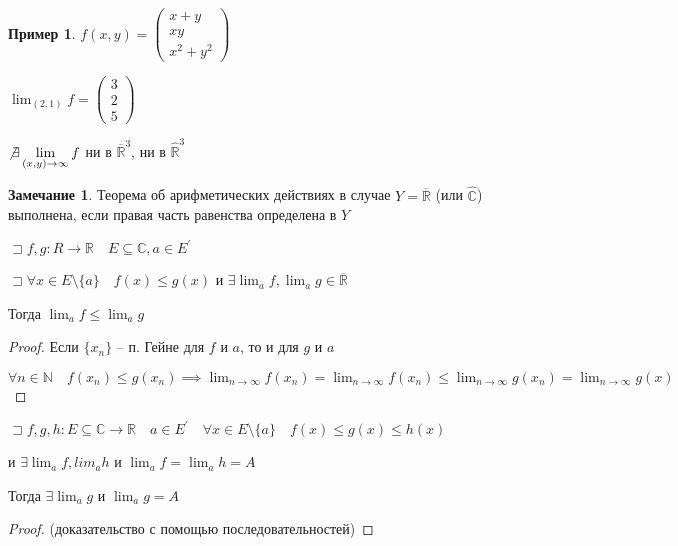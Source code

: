 \documentclass{book}
\newcommand\N{\ensuremath{\mathbb{N}}}
\newcommand\R{\ensuremath{\mathbb{R}}}
\renewcommand\C{\ensuremath{\mathbb{C}}}
\newcommand{\p}[1]{#1^{\prime}}
\newcommand{\ov}[1]{\overline{#1}}
\theoremstyle{definition}
\newtheorem*{note}{Замечание}
\newtheorem*{example}{Пример}
\begin{document}
\begin{example}
    $f(x, y) = \begin{pmatrix} x+y\\xy\\x^2+y^2 \end{pmatrix} $ 

    $\lim_{(2,1)}f = \begin{pmatrix} 3\\2\\5 \end{pmatrix}  $

    $\not\exists \lim_{(x, y)\to \infty }f $ ни в $\ov{\R}^3$, ни в  $\widehat{\R}^3$
\end{example}

\begin{note}
    Теорема об арифметических действиях в случае $Y = \ov{\R}$ (или $\widehat{\C}$) выполнена, если правая часть равенства определена в $Y$
\end{note}

\begin{theorem}
    $\sqsupset f, g:R\to \R\quad E\subseteq \C, a\in \p E$

    $\sqsupset \forall x\in E\setminus \{a\}\quad f(x)\leqslant g(x)$ и $\exists \lim _af, \lim_ag \in \ov{\R}$

    Тогда $\lim_af\leqslant \lim_ag$
\end{theorem}
\begin{proof}
    Если $\{x_{n} \}$ -- п. Гейне для $f$ и $a$, то и для  $g$  и $a$

    $\forall n\in \N \quad f(x_{n} )\leqslant g(x_{n} )\implies \lim_{n \to \infty} f(x_{n} ) = \lim_{n \to \infty} f(x_{n} )\leqslant \lim_{n \to \infty} g(x_{n} ) = \lim_{n \to \infty} g(x)$
\end{proof}

\begin{theorem}

   $\sqsupset f, g,h :E\subseteq \C\to \R\quad a\in \p E\quad \forall x\in E\setminus \{a\}\quad f(x)\leqslant g(x)\leqslant h(x)$

   и $\exists \lim_af, lim_ah$ и $\lim_af = \lim_ah = A$

   Тогда  $\exists \lim_ag$ и $\lim_ag = A$
\end{theorem}
\begin{proof}
    (доказательство с помощью последовательностей)
\end{proof}
\end{document}
